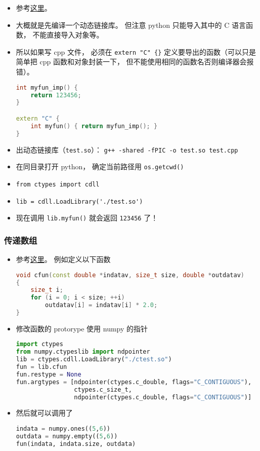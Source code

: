
\begin{issues}
\issueDraft
\end{issues}

\begin{itemize}
\item 参考\href{https://www.geeksforgeeks.org/how-to-call-c-c-from-python/}{这里}。
\item 大概就是先编译一个动态链接库。 但注意 python 只能导入其中的 C 语言函数， 不能直接导入对象等。
\item 所以如果写 cpp 文件， 必须在 \verb`extern "C" {}` 定义要导出的函数（可以只是简单把 cpp 函数和对象封装一下， 但不能使用相同的函数名否则编译器会报错）。
\begin{lstlisting}[language=cpp, caption=test.cpp]
int myfun_imp() {
	return 123456;
}

extern "C" {
	int myfun() { return myfun_imp(); }
}
\end{lstlisting}
\item {} 出动态链接库（\verb`test.so`）： \verb`g++ -shared -fPIC -o test.so test.cpp`
\item 在同目录打开 python， 确定当前路径用 \verb`os.getcwd()`
\item \verb`from ctypes import cdll`
\item \verb`lib = cdll.LoadLibrary('./test.so')`
\item 现在调用 \verb`lib.myfun()` 就会返回 \verb`123456` 了！
\end{itemize}

\subsubsection{传递数组}
\begin{itemize}
\item 参考\href{https://stackoverflow.com/questions/5862915/passing-numpy-arrays-to-a-c-function-for-input-and-output}{这里}。 例如定义以下函数
\begin{lstlisting}[language=cpp]
void cfun(const double *indatav, size_t size, double *outdatav) 
{
    size_t i;
    for (i = 0; i < size; ++i)
        outdatav[i] = indatav[i] * 2.0;
}
\end{lstlisting}
\item 修改函数的 protorype 使用 numpy 的指针
\begin{lstlisting}[language=python]
import ctypes
from numpy.ctypeslib import ndpointer
lib = ctypes.cdll.LoadLibrary("./ctest.so")
fun = lib.cfun
fun.restype = None
fun.argtypes = [ndpointer(ctypes.c_double, flags="C_CONTIGUOUS"),
                ctypes.c_size_t,
                ndpointer(ctypes.c_double, flags="C_CONTIGUOUS")]
\end{lstlisting}
\item 然后就可以调用了
\begin{lstlisting}[language=python]
indata = numpy.ones((5,6))
outdata = numpy.empty((5,6))
fun(indata, indata.size, outdata)
\end{lstlisting}
\end{itemize}
